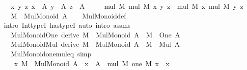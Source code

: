 \begin{isabellebody}
\ \ \ {\isachardoublequoteopen}{\isasymAnd}x\ y\ z{\isachardot}{\kern0pt}\ {\isasymlbrakk}x\ {\isacharcolon}{\kern0pt}\ A{\isacharsemicolon}{\kern0pt}\ y\ {\isacharcolon}{\kern0pt}\ A{\isacharsemicolon}{\kern0pt}\ z\ {\isacharcolon}{\kern0pt}\ A{\isasymrbrakk}\ {\isasymLongrightarrow}\isanewline
\ \ \ \ mul\ M\ {\isacharparenleft}{\kern0pt}mul\ M\ x\ y{\isacharparenright}{\kern0pt}\ z\ {\isacharequal}{\kern0pt}\ mul\ M\ x\ {\isacharparenleft}{\kern0pt}mul\ M\ y\ z{\isacharparenright}{\kern0pt}{\isachardoublequoteclose}\isanewline
\ \ \ {\isachardoublequoteopen}M\ {\isacharcolon}{\kern0pt}\ Mul{\isacharunderscore}{\kern0pt}Monoid\ A{\isachardoublequoteclose}\isanewline
%
\isadelimproof
\ \ %
\endisadelimproof
%
\isatagproof
{}\isamarkupfalse%
\ Mul{\isacharunderscore}{\kern0pt}Monoid{\isacharunderscore}{\kern0pt}def\ \isamarkupfalse%
\ {\isacharparenleft}{\kern0pt}intro\ Int{\isacharunderscore}{\kern0pt}typeI\ has{\isacharunderscore}{\kern0pt}typeI{\isacharparenright}{\kern0pt}\ {\isacharparenleft}{\kern0pt}auto\ intro{\isacharcolon}{\kern0pt}\ assms{\isacharparenright}{\kern0pt}%
\endisatagproof
{\isafoldproof}%
%
\isadelimproof
\isanewline
%
\endisadelimproof
\isanewline
{}\isamarkupfalse%
\isanewline
\ \ \ Mul{\isacharunderscore}{\kern0pt}Monoid{\isacharunderscore}{\kern0pt}One\ {\isacharbrackleft}{\kern0pt}derive{\isacharbrackright}{\kern0pt}{\isacharcolon}{\kern0pt}\ {\isachardoublequoteopen}M\ {\isacharcolon}{\kern0pt}\ Mul{\isacharunderscore}{\kern0pt}Monoid\ A\ {\isasymLongrightarrow}\ M\ {\isacharcolon}{\kern0pt}\ One\ A{\isachardoublequoteclose}\isanewline
\ \ \ Mul{\isacharunderscore}{\kern0pt}Monoid{\isacharunderscore}{\kern0pt}Mul\ {\isacharbrackleft}{\kern0pt}derive{\isacharbrackright}{\kern0pt}{\isacharcolon}{\kern0pt}\ {\isachardoublequoteopen}M\ {\isacharcolon}{\kern0pt}\ Mul{\isacharunderscore}{\kern0pt}Monoid\ A\ {\isasymLongrightarrow}\ M\ {\isacharcolon}{\kern0pt}\ Mul\ A{\isachardoublequoteclose}\isanewline
\ \ \ Mul{\isacharunderscore}{\kern0pt}Monoid{\isacharunderscore}{\kern0pt}one{\isacharunderscore}{\kern0pt}mul{\isacharunderscore}{\kern0pt}eq\ {\isacharbrackleft}{\kern0pt}simp{\isacharbrackright}{\kern0pt}{\isacharcolon}{\kern0pt}\isanewline
\ \ \ \ {\isachardoublequoteopen}{\isasymAnd}x{\isachardot}{\kern0pt}\ M\ {\isacharcolon}{\kern0pt}\ Mul{\isacharunderscore}{\kern0pt}Monoid\ A\ {\isasymLongrightarrow}\ x\ {\isacharcolon}{\kern0pt}\ A\ {\isasymLongrightarrow}\ mul\ M\ {\isacharparenleft}{\kern0pt}one\ M{\isacharparenright}{\kern0pt}\ x\ {\isacharequal}{\kern0pt}\ x{\isachardoublequoteclose}\isanewline

\end{isabellebody}

